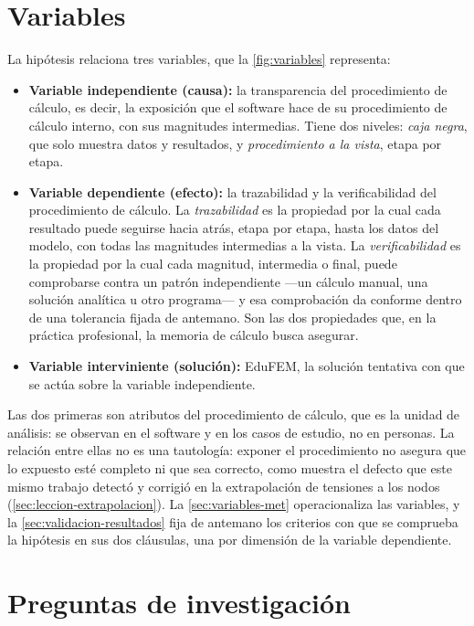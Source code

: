 \section*{Variables}

La hipótesis relaciona tres variables, que la \autoref{fig:variables} representa:
\begin{itemize}
    \item \textbf{Variable independiente (causa):} la transparencia del procedimiento de cálculo, es decir, la exposición que el software hace de su procedimiento de cálculo interno, con sus magnitudes intermedias. Tiene dos niveles: \emph{caja negra}, que solo muestra datos y resultados, y \emph{procedimiento a la vista}, etapa por etapa.
    \item \textbf{Variable dependiente (efecto):} la trazabilidad y la verificabilidad del procedimiento de cálculo. La \emph{trazabilidad} es la propiedad por la cual cada resultado puede seguirse hacia atrás, etapa por etapa, hasta los datos del modelo, con todas las magnitudes intermedias a la vista. La \emph{verificabilidad} es la propiedad por la cual cada magnitud, intermedia o final, puede comprobarse contra un patrón independiente ---un cálculo manual, una solución analítica u otro programa--- y esa comprobación da conforme dentro de una tolerancia fijada de antemano. Son las dos propiedades que, en la práctica profesional, la memoria de cálculo busca asegurar.
    \item \textbf{Variable interviniente (solución):} EduFEM, la solución tentativa con que se actúa sobre la variable independiente.
\end{itemize}

Las dos primeras son atributos del procedimiento de cálculo, que es la unidad de análisis: se observan en el software y en los casos de estudio, no en personas. La relación entre ellas no es una tautología: exponer el procedimiento no asegura que lo expuesto esté completo ni que sea correcto, como muestra el defecto que este mismo trabajo detectó y corrigió en la extrapolación de tensiones a los nodos (\autoref{sec:leccion-extrapolacion}). La \autoref{sec:variables-met} operacionaliza las variables, y la \autoref{sec:validacion-resultados} fija de antemano los criterios con que se comprueba la hipótesis en sus dos cláusulas, una por dimensión de la variable dependiente.

\section*{Preguntas de investigación}

